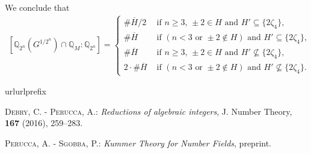 \documentclass[10pt,a4paper]{article}
\theoremstyle{definition}
\begin{document}
\begin{itemize}
We conclude that
\begin{align*}
\left[\mathbb{Q}_{2^n}\left(G^{1/2^n}\right)\cap \mathbb{Q}_M:\mathbb{Q}_{2^n}\right]=\begin{cases}
\#\overline{H}/2&\text{ if } n\geq 3,\,\pm2 \in H\text{ and }H'\subseteq\{2\zeta_4\},\\
\#\overline{H}&\text{ if }(n<3\text{ or }\pm2\not\in H)\text{ and }H'\subseteq \{2\zeta_4\},\\
\#\overline{H}&\text{ if } n\geq 3,\,\pm2 \in H\text{ and }H'\not\subseteq\{2\zeta_4\},\\
2\cdot \#\overline{H}&\text{ if }(n<3\text{ or }\pm2\not\in H)\text{ and }H'\not\subseteq \{2\zeta_4\}.
\end{cases}
\end{align*}
\end{itemize}

\begin{thebibliography}{10} \expandafter\ifx\csname url\endcsname\relax   \def\url#1{\texttt{#1}}\fi \expandafter\ifx\csname urlprefix\endcsname\relax\def\urlprefix{URL }\fi

\textsc{Debry, C. - Perucca, A.}: \emph{Reductions of algebraic integers}, J. Number Theory, {\bf 167} (2016), 259--283.

\textsc{Perucca, A. - Sgobba, P.}: \emph{Kummer Theory for Number Fields}, preprint.

\end{thebibliography}
\end{document}
